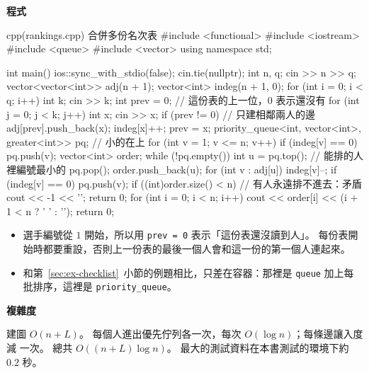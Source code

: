 \textbf{程式}

\begin{example}[label=ex:rankings]{cpp}{(rankings.cpp) 合併多份名次表}
#include <functional>
#include <iostream>
#include <queue>
#include <vector>
using namespace std;

int main() {
    ios::sync_with_stdio(false);
    cin.tie(nullptr);
    int n, q;
    cin >> n >> q;
    vector<vector<int>> adj(n + 1);
    vector<int> indeg(n + 1, 0);
    for (int i = 0; i < q; i++) {
        int k;
        cin >> k;
        int prev = 0;                       // 這份表的上一位，0 表示還沒有
        for (int j = 0; j < k; j++) {
            int x;
            cin >> x;
            if (prev != 0) {                // 只建相鄰兩人的邊
                adj[prev].push_back(x);
                indeg[x]++;
            }
            prev = x;
        }
    }
    priority_queue<int, vector<int>, greater<int>> pq;   // 小的在上
    for (int v = 1; v <= n; v++) {
        if (indeg[v] == 0) {
            pq.push(v);
        }
    }
    vector<int> order;
    while (!pq.empty()) {
        int u = pq.top();                   // 能排的人裡編號最小的
        pq.pop();
        order.push_back(u);
        for (int v : adj[u]) {
            indeg[v]--;
            if (indeg[v] == 0) {
                pq.push(v);
            }
        }
    }
    if ((int)order.size() < n) {            // 有人永遠排不進去：矛盾
        cout << -1 << '\n';
        return 0;
    }
    for (int i = 0; i < n; i++) {
        cout << order[i] << (i + 1 < n ? ' ' : '\n');
    }
    return 0;
}
\end{example}


\begin{itemize}
\item 選手編號從 $1$ 開始，所以用 \texttt{prev = 0} 表示「這份表還沒讀到人」。
每份表開始時都要重設，否則上一份表的最後一個人會和這一份的第一個人連起來。
\item 和第~\ref{sec:ex-checklist}~小節的例題相比，只差在容器：那裡是
\texttt{queue} 加上每批排序，這裡是 \texttt{priority\_queue}。
\end{itemize}

\textbf{複雜度}

建圖 $O(n + L)$。 每個人進出優先佇列各一次，每次 $O(\log n)$；每條邊讓入度減
一次。 總共 $O((n + L) \log n)$。 最大的測試資料在本書測試的環境下約 $0.2$ 秒。

